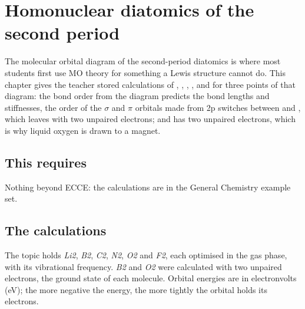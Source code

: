 \chapter{Homonuclear diatomics of the second period}
\label{ch:t-diatomics}

The molecular orbital diagram of the second-period diatomics is where most students first use MO theory for something a Lewis structure cannot do. This chapter gives the teacher stored calculations of , , , ,  and  for three points of that diagram: the bond order from the diagram predicts the bond lengths and stiffnesses, the order of the $\sigma$ and $\pi$ orbitals made from 2p switches between  and , which leaves  with two unpaired electrons; and  has two unpaired electrons, which is why liquid oxygen is drawn to a magnet.

\section*{This requires}
Nothing beyond ECCE: the calculations are in the General Chemistry example set.

\section{The calculations}
The topic  holds \emph{Li2}, \emph{B2}, \emph{C2}, \emph{N2}, \emph{O2} and \emph{F2}, each optimised in the gas phase, with its vibrational frequency. \emph{B2} and \emph{O2} were calculated with two unpaired electrons, the ground state of each molecule. Orbital energies are in electronvolts (eV); the more negative the energy, the more tightly the orbital holds its electrons.

